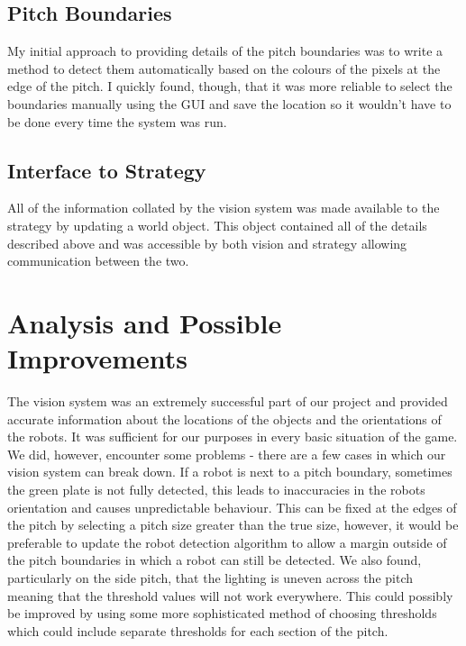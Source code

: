 \documentclass[dvips]{article}
\begin{document}
\subsection{Pitch Boundaries}
My initial approach to providing details of the pitch boundaries was to write a method to detect
them automatically based on the colours of the pixels at the edge of the pitch. I quickly found, though,
that it was more reliable to select the boundaries manually using the GUI and save the location 
so it wouldn't have to be done every time the system was run.

\subsection{Interface to Strategy}
All of the information collated by the vision system was made available to the strategy by updating
a world object. This object contained all of the details described above and was accessible by
both vision and strategy allowing communication between the two.

\section{Analysis and Possible Improvements}
The vision system was an extremely successful part of our project and provided accurate information
about the locations of the objects and the orientations of the robots. It was sufficient for our
purposes in every basic situation of the game. We did, however, encounter some problems - 
there are a few cases in which our vision system can break down. If  a robot is next to a pitch
boundary, sometimes the green plate is not fully detected, this leads to inaccuracies in the robots
orientation and causes unpredictable behaviour. This can be fixed at the edges of the pitch by
selecting a pitch size greater than the true size, however, it would be preferable to update
the robot detection algorithm to allow a margin outside of the pitch boundaries in which a robot
can still be detected. We also found, particularly on the side pitch, that
the lighting is uneven across the pitch meaning that the threshold values will not work everywhere.
This could possibly be improved by using some more sophisticated method of choosing thresholds which could
include separate thresholds for each section of the pitch.
\end{document}
